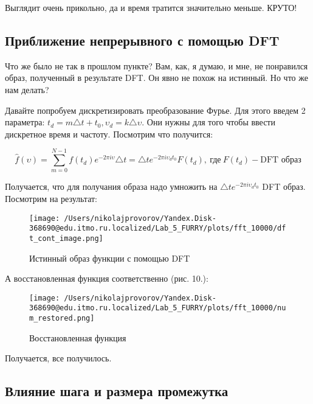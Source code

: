 Выглядит очень прикольно, да и время тратится значительно меньше. КРУТО!

\subsection{Приближение непрерывного с помощью DFT}

Что же было не так в прошлом пункте? Вам, как, я думаю, и мне, не понравился образ, полученный в результате DFT. Он явно не похож на истинный. Но что же нам делать?

Давайте попробуем дискретизировать преобразование Фурье. Для этого введем 2 параметра: $t_d = m\triangle t + t_0, \upsilon_d=k\triangle \upsilon$. Они нужны для того чтобы ввести дискретное время и частоту. Посмотрим что получится:

\begin{equation}
    \hat{f}(\upsilon) = \sum_{m = 0}^{N - 1}f(t_d)e^{-2\pi i\upsilon} \triangle t = \triangle t e^{-2\pi i\upsilon _d t_0} F(t_d),~\text{где}~ F(t_d) - \text{DFT образ}
\end{equation}

Получается, что для получания образа надо умножить на $ \triangle t e^{-2\pi i\upsilon _d t_0} $ DFT образ. Посмотрим на результат:

\begin{figure}
    \centering
    \texttt{[image: /Users/nikolajprovorov/Yandex.Disk-368690@edu.itmo.ru.localized/Lab\_5\_FURRY/plots/fft\_10000/dft\_cont\_image.png]}
    \caption{Истинный образ функции с помощью DFT}
\end{figure}

А восстановленная функция соответственно (рис. 10.):

\begin{figure}
    \centering
    \texttt{[image: /Users/nikolajprovorov/Yandex.Disk-368690@edu.itmo.ru.localized/Lab\_5\_FURRY/plots/fft\_10000/num\_restored.png]}
    \caption{Восстановленная функция}
\end{figure}

Получается, все получилось.

\clearpage

\subsection{Влияние шага и размера промежутка}